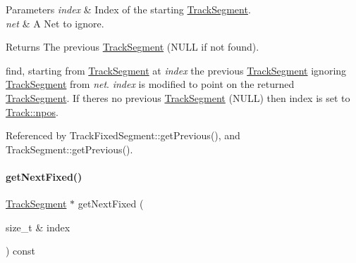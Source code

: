 \begin{DoxyParams}{Parameters}
{\em index} & Index of the starting \hyperlink{classKite_1_1TrackSegment}{Track\+Segment}. \\
\hline
{\em net} & A {\ttfamily Net} to ignore. \\
\hline
\end{DoxyParams}
\begin{DoxyReturn}{Returns}
The previous \hyperlink{classKite_1_1TrackSegment}{Track\+Segment} ({\ttfamily N\+U\+LL} if not found).
\end{DoxyReturn}
find, starting from \hyperlink{classKite_1_1TrackSegment}{Track\+Segment} at {\itshape index} the previous \hyperlink{classKite_1_1TrackSegment}{Track\+Segment} ignoring \hyperlink{classKite_1_1TrackSegment}{Track\+Segment} from {\itshape net}. {\itshape index} is modified to point on the returned \hyperlink{classKite_1_1TrackSegment}{Track\+Segment}. If there\textquotesingle{}s no previous \hyperlink{classKite_1_1TrackSegment}{Track\+Segment} ({\ttfamily N\+U\+LL}) then index is set to \hyperlink{classKite_1_1Track_ae0070ea45b2592ce3701ab9e486e58a0}{Track\+::npos}. 

Referenced by Track\+Fixed\+Segment\+::get\+Previous(), and Track\+Segment\+::get\+Previous().

\mbox{\label{classKite_1_1Track_a72e18efeecb4641a1ad2989d80b48fec}} 
\paragraph{\texorpdfstring{get\+Next\+Fixed()}{getNextFixed()}}
{\footnotesize\ttfamily \hyperlink{classKite_1_1TrackSegment}{Track\+Segment} $\ast$ get\+Next\+Fixed (\begin{DoxyParamCaption}\item[{size\+\_\+t \&}]{index }\end{DoxyParamCaption}) const}


